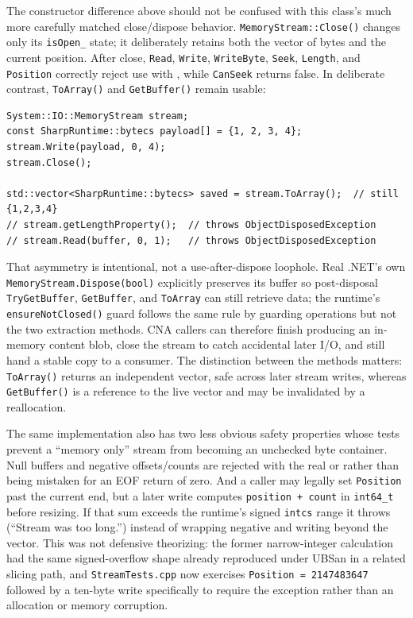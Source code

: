 The constructor difference above should not be confused with this class's much more carefully
matched close/dispose behavior.  \texttt{MemoryStream::Close()} changes only its
\texttt{isOpen\_} state; it deliberately retains both the vector of bytes and the current
position.  After close, \texttt{Read}, \texttt{Write}, \texttt{WriteByte}, \texttt{Seek},
\texttt{Length}, and \texttt{Position} correctly reject use with
, while \texttt{CanSeek} returns false.  In deliberate
contrast, \texttt{ToArray()} and \texttt{GetBuffer()} remain usable:

\begin{lstlisting}
System::IO::MemoryStream stream;
const SharpRuntime::bytecs payload[] = {1, 2, 3, 4};
stream.Write(payload, 0, 4);
stream.Close();

std::vector<SharpRuntime::bytecs> saved = stream.ToArray();  // still {1,2,3,4}
// stream.getLengthProperty();  // throws ObjectDisposedException
// stream.Read(buffer, 0, 1);   // throws ObjectDisposedException
\end{lstlisting}

That asymmetry is intentional, not a use-after-dispose loophole.  Real .NET's own
\texttt{MemoryStream.Dispose(bool)} explicitly preserves its buffer so post-disposal
\texttt{TryGetBuffer}, \texttt{GetBuffer}, and \texttt{ToArray} can still retrieve data; the
runtime's \texttt{ensureNotClosed()} guard follows the same rule by guarding operations but not
the two extraction methods.  CNA callers can therefore finish producing an in-memory content
blob, close the stream to catch accidental later I/O, and still hand a stable copy to a consumer.
The distinction between the methods matters: \texttt{ToArray()} returns an independent vector,
safe across later stream writes, whereas \texttt{GetBuffer()} is a reference to the live vector
and may be invalidated by a reallocation.

The same implementation also has two less obvious safety properties whose tests prevent a
``memory only'' stream from becoming an unchecked byte container.  Null buffers and negative
offsets/counts are rejected with the real  or
 rather than being mistaken for an EOF return of zero.
And a caller may legally set \texttt{Position} past the current end, but a later write computes
\texttt{position + count} in \texttt{int64\_t} before resizing.  If that sum exceeds the
runtime's signed \texttt{intcs} range it throws  (``Stream was too
long.'') instead of wrapping negative and writing beyond the vector.  This was not defensive
theorizing: the former narrow-integer calculation had the same signed-overflow shape already
reproduced under UBSan in a related slicing path, and \texttt{StreamTests.cpp} now exercises
\texttt{Position = 2147483647} followed by a ten-byte write specifically to require the
exception rather than an allocation or memory corruption.


